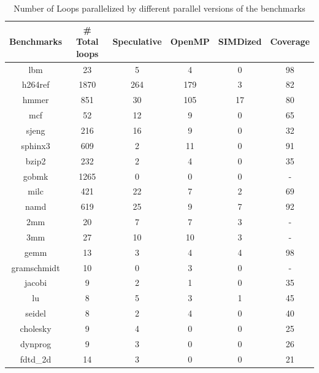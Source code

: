 \documentclass[10pt]{report}          %
\begin{document}
\begin{table}
\centering
\caption{Number of Loops parallelized by different parallel versions of the benchmarks}
\begin{tabular}{|c||c|c|c|c|c|} \hline
Benchmarks & \# Total loops & Speculative & OpenMP & SIMDized & Coverage \\ \hline
lbm & 23 & 5 & 4  &	0 & 98\\ \hline
h264ref & 1870 & 264 & 179 & 3 & 82 \\ \hline
hmmer &	 851	 & 30 & 105 & 17 & 80 \\ \hline
mcf & 52 & 12 & 9 & 0 & 65 \\ \hline
sjeng &	216 & 16	 & 9 & 0 & 32 \\ \hline
sphinx3 & 609 & 2 & 11 & 0 & 91 \\ \hline
bzip2 & 232 & 2 & 4 & 0 & 35 \\ \hline
gobmk & 1265 & 0 & 0 & 0 & - \\ \hline
milc & 421 & 22 & 7 & 2 & 69 \\ \hline
namd & 619 & 25 & 9 & 7 & 92 \\ \hline	
2mm	&20& 7 &7 & 3 & - \\ \hline
3mm	&27& 10&10 & 3 & - \\ \hline	
gemm & 13 & 3 & 4 & 4 & 98 \\ \hline
gramschmidt & 10 & 0 & 3 & 0 & - \\ \hline
jacobi & 9 & 2 & 1 & 0 & 35 \\ \hline
lu & 8 & 5 & 3 & 1 & 45 \\ \hline
seidel & 8 & 2 & 4 & 0 & 40 \\ \hline	
cholesky & 9 & 4 & 0 & 0 & 25 \\ \hline
dynprog & 9 & 3 & 0 & 0 & 26 \\ \hline
fdtd\_2d & 14 & 3 & 0 & 0 & 21 \\ \hline
\hline\end{tabular}
\label{table:coverage_2}
\end{table}
\end{document}
